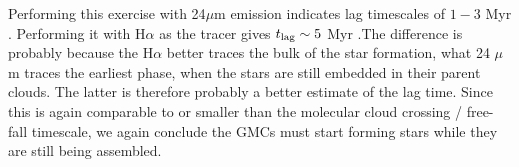 Performing this exercise with 24$\mu$m emission indicates lag timescales of $1-3$ Myr \citet{tamburro08a}. Performing it with H$\alpha$ as the tracer gives $t_{\rm lag}\sim 5$ Myr \citet{egusa04a}.The difference is probably because the H$\alpha$ better traces the bulk of the star formation, what 24 $\mu$m traces the earliest phase, when the stars are still embedded in their parent clouds. The latter is therefore probably a better estimate of the lag time. Since this is again comparable to or smaller than the molecular cloud crossing / free-fall timescale, we again conclude the GMCs must start forming stars while they are still being assembled.

